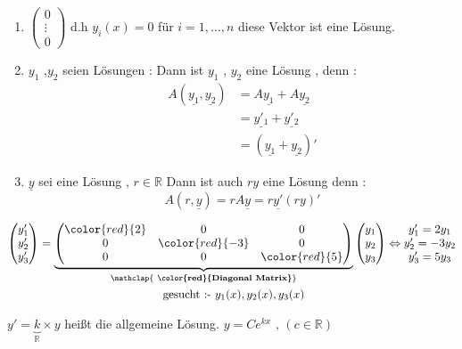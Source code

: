 \begin{remark}\hfill 
\begin{enumerate}
\item 
$\begin{pmatrix}
0\\
\vdots\\
0
\end{pmatrix}$
d.h $y_i(x)=0$ für $i=1 , \dots , n$ diese Vektor ist eine Lösung.
\item $y_1$ ,$y_2$ seien Lösungen : Dann ist $y_1$ , $y_2$ eine Lösung , denn : \begin{align*}
A(\underline{y_1} , \underline{y_2}) &= A \underline{y_1} + A\underline{y_2} \\
&= \underline{y'_1} + \underline{y'_2}\\
&= (\underline{y_1} + \underline{y_2})'
\end{align*}  
\item $\underline{y}$ sei eine Lösung , $r \in \mathbb{R}$ Dann ist auch $ry$ eine Lösung denn :
\[ A(r , \underline{y}) = r A \underline{y} = r \underline{y'}(ry)'\] 
\end{enumerate}
\end{remark}
\begin{example}
\begin{gather*}
\begin{pmatrix}
y_1'\\
y_2'\\
y_3'
\end{pmatrix}=
\underbrace{\begin{pmatrix}
\color{red}{2} & 0 & 0\\
0 & \color{red}{-3} & 0\\
0 & 0 & \color{red}{5}
\end{pmatrix} 
}_{\mathclap{\textbf{ \color{red}{Diagonal Matrix}}}}
\begin{pmatrix}
y_1\\
y_2\\
y_3
\end{pmatrix} \Leftrightarrow 
\begin{matrix}
y_1' = 2 y_1\\
y_2' = -3y_2\\
y_3' = 5y_3
\end{matrix}\\
\text{ gesucht :- } y_1(x) , y_2(x) , y_3(x)
\end{gather*}
\end{example}
\begin{remark}
$y'= \underbrace{k}_{\mathbb{R}} \times y$ heißt die allgemeine Lösung.
$y = C e^{kx}\text{ , } (c \in \mathbb{R})$
\end{remark}
